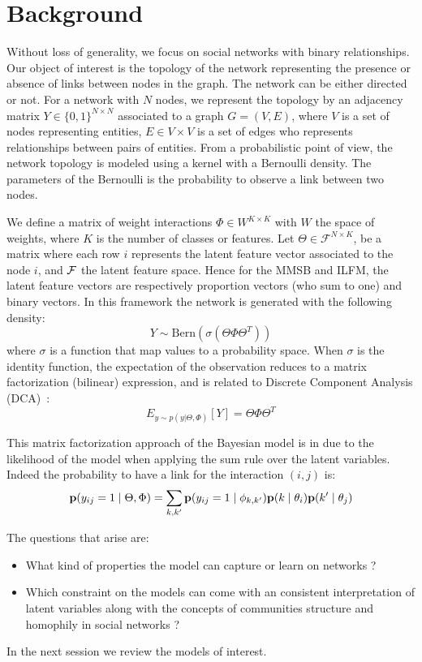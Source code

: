 \section{Background}

Without loss of generality, we focus on social networks with binary relationships. Our object of interest is the topology of the network representing the presence or absence of links between nodes in the graph. The network can be either directed or not. For a network with $N$ nodes, we represent the topology by an adjacency matrix $Y \in \{0,1\}^{N\times N}$ associated to a graph $G = (V,E)$, where $V$ is a set of nodes representing entities, $E \in V \times V$ is a set of edges who represents relationships between pairs of entities. From a probabilistic point of view, the network topology is modeled using a kernel with a Bernoulli density. The parameters of the Bernoulli is the probability to observe a link between two nodes.

We define a matrix of weight interactions $\Phi \in W^{K\times K}$ with $W$ the space of weights, where $K$ is the number of classes or features. Let $\Theta \in \mathcal{F}^{N\times K}$, be a matrix where each row $i$ represents the latent feature vector associated to the node $i$,  and $\cal{F}$ the latent feature space. Hence for the MMSB and ILFM, the latent feature vectors are respectively proportion vectors (who sum to one) and binary vectors. In this framework the network is generated with the following density:
\begin{equation} \label{MFDCA}
    Y \sim \mathrm{Bern}(\sigma(\Theta \Phi  \Theta^T))
\end{equation}
where $\sigma$ is a function that map values to a probability space. When $\sigma$ is the identity function, the expectation of the observation reduces to a matrix factorization (bilinear) expression, and is related to Discrete Component Analysis (DCA)~\cite{DCA}:
\begin{equation}
E_{y \sim p(y|\Theta, \Phi)}[Y] = \Theta \Phi  \Theta^T
\end{equation}

This matrix factorization approach of the Bayesian model is in due to the likelihood of the model when applying the sum rule over the latent variables. Indeed the probability to have a link for the interaction $(i,j)$ is:
\begin{equation}
\mathbf{p}(y_{ij}=1 \mid \Theta, \Phi ) = \sum_{k, k'} \mathbf{p}(y_{ij}=1\mid\phi_{k,k'}) \mathbf{p}(k \mid\theta_i) \mathbf{p}(k' \mid \theta_j)
\end{equation}


The questions that arise are:
\begin{itemize}
	\item What kind of properties the model can capture or learn on networks ?
	\item Which constraint on the models can come with an consistent interpretation of latent variables along with the concepts of communities structure and homophily in social networks  ?
\end{itemize} 

In the next session we review the models of interest.

